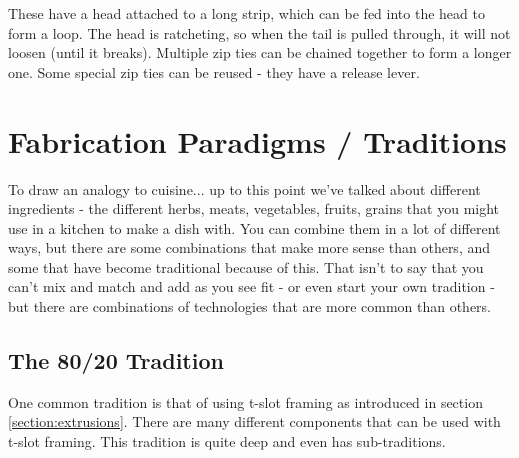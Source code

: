 \documentclass[10pt,letterpaper]{book}
\begin{document}
	These have a head attached to a long strip, which can be fed into the head to form a loop. The head is ratcheting, so when the tail is pulled through, it will not loosen (until it breaks). Multiple zip ties can be chained together to form a longer one. Some special zip ties can be reused - they have a release lever.

	\section{Fabrication Paradigms / Traditions}
	To draw an analogy to cuisine... up to this point we've talked about different ingredients - the different herbs, meats, vegetables, fruits, grains that you might use in a kitchen to make a dish with. You can combine them in a lot of different ways, but there are some combinations that make more sense than others, and some that have become traditional because of this. That isn't to say that you can't mix and match and add as you see fit - or even start your own tradition - but there are combinations of technologies that are more common than others. 
	
	\subsection{The 80/20 Tradition}
	One common tradition is that of using t-slot framing as introduced in section \ref{section:extrusions}. There are many different components that can be used with t-slot framing. This tradition is quite deep and even has sub-traditions.
	
\end{document}
